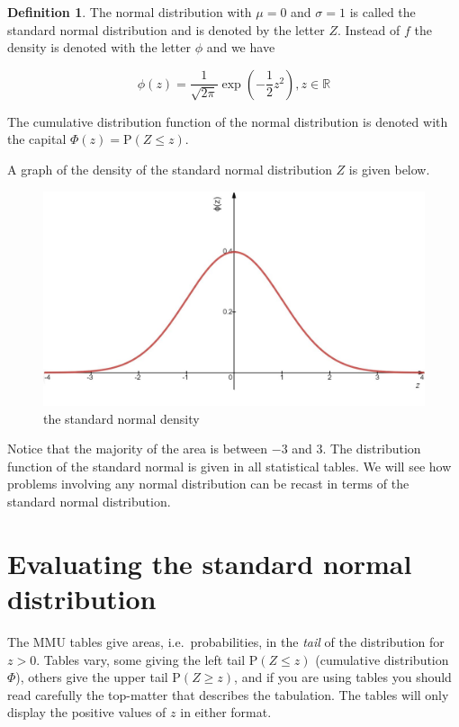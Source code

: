 \documentclass[
]{book}
\theoremstyle{definition}
\newtheorem{definition}{Definition}[chapter]
\theoremstyle{definition}
\theoremstyle{definition}
\theoremstyle{definition}
\theoremstyle{remark}
\begin{document}
\begin{definition}
The normal distribution with \(\mu=0\) and \(\sigma =1\) is called the standard normal distribution and is denoted by the letter \(Z\). Instead of \(f\) the density is denoted with the letter \(\phi\) and we have

\[\phi (z) = \frac{1}{\sqrt{2\pi}} \exp \left( -\frac{1}{2}z^2 \right) , z\in \mathbb{R}\]

The cumulative distribution function of the normal distribution is denoted with the capital \(\Phi(z) = \text{P}(Z\leq z)\).
\end{definition}

A graph of the density of the standard normal distribution \(Z\) is given below.

\begin{figure}

{\centering \includegraphics[width=0.75\linewidth]{./figures/znorm} 

}

\caption{the standard normal density}\label{fig:norm4}
\end{figure}

Notice that the majority of the area is between \(-3\) and \(3\). The distribution function of the standard normal is given in all statistical tables. We will see how problems involving any normal distribution can be recast in terms of the standard normal distribution.

\hypertarget{evaluating-the-standard-normal-distribution}{%
\section{Evaluating the standard normal distribution}\label{evaluating-the-standard-normal-distribution}}

The MMU tables give areas, i.e.~probabilities, in the \emph{tail} of the distribution for \(z>0\). Tables vary, some giving the left tail \(\text{P}(Z\leq z)\) (cumulative distribution \(\Phi\)), others give the upper tail \(\text{P}(Z\geq z)\), and if you are using tables you should read carefully the top-matter that describes the tabulation. The tables will only display the positive values of \(z\) in either format.
\end{document}

